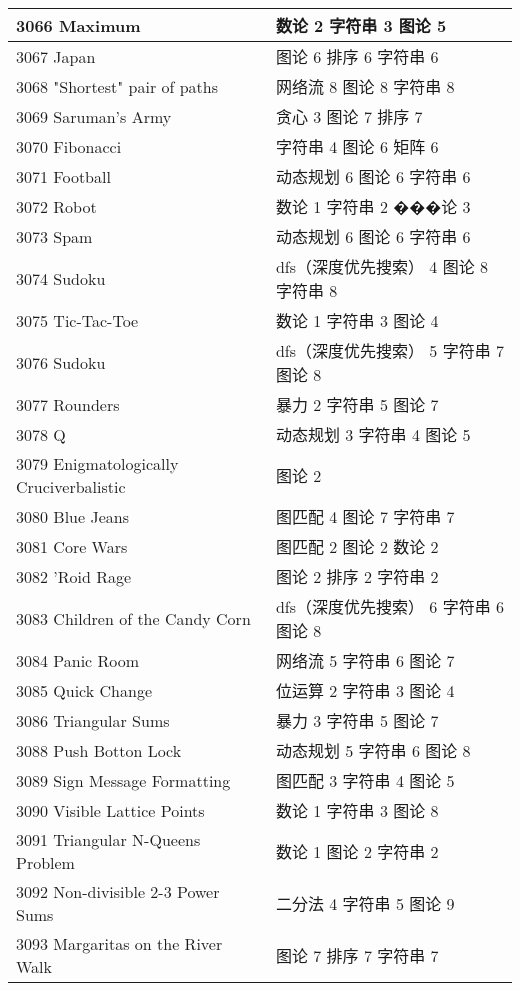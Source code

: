 \begin{longtable}{| p{} | p{} |}
 3066 Maximum  & 数论 2 字符串 3 图论 5 \\ \hline
 3067 Japan  & 图论 6 排序 6 字符串 6 \\ \hline
 3068 "Shortest" pair of paths  & 网络流 8 图论 8 字符串 8 \\ \hline
 3069 Saruman's Army  & 贪心 3 图论 7 排序 7 \\ \hline
 3070 Fibonacci  & 字符串 4 图论 6 矩阵 6 \\ \hline
 3071 Football  & 动态规划 6 图论 6 字符串 6 \\ \hline
 3072 Robot  & 数论 1 字符串 2 ���论 3 \\ \hline
 3073 Spam  & 动态规划 6 图论 6 字符串 6 \\ \hline
 3074 Sudoku  & dfs（深度优先搜索） 4 图论 8 字符串 8 \\ \hline
 3075 Tic-Tac-Toe  & 数论 1 字符串 3 图论 4 \\ \hline
 3076 Sudoku  & dfs（深度优先搜索） 5 字符串 7 图论 8 \\ \hline
 3077 Rounders  & 暴力 2 字符串 5 图论 7 \\ \hline
 3078 Q  & 动态规划 3 字符串 4 图论 5 \\ \hline
 3079 Enigmatologically Cruciverbalistic  & 图论 2 \\ \hline
 3080 Blue Jeans  & 图匹配 4 图论 7 字符串 7 \\ \hline
 3081 Core Wars  & 图匹配 2 图论 2 数论 2 \\ \hline
 3082 'Roid Rage  & 图论 2 排序 2 字符串 2 \\ \hline
 3083 Children of the Candy Corn  & dfs（深度优先搜索） 6 字符串 6 图论 8 \\ \hline
 3084 Panic Room  & 网络流 5 字符串 6 图论 7 \\ \hline
 3085 Quick Change  & 位运算 2 字符串 3 图论 4 \\ \hline
 3086 Triangular Sums  & 暴力 3 字符串 5 图论 7 \\ \hline
 3088 Push Botton Lock  & 动态规划 5 字符串 6 图论 8 \\ \hline
 3089 Sign Message Formatting  & 图匹配 3 字符串 4 图论 5 \\ \hline
 3090 Visible Lattice Points  & 数论 1 字符串 3 图论 8 \\ \hline
 3091 Triangular N-Queens Problem  & 数论 1 图论 2 字符串 2 \\ \hline
 3092 Non-divisible 2-3 Power Sums  & 二分法 4 字符串 5 图论 9 \\ \hline
 3093 Margaritas on the River Walk  & 图论 7 排序 7 字符串 7 \\ \hline

\end{longtable}
